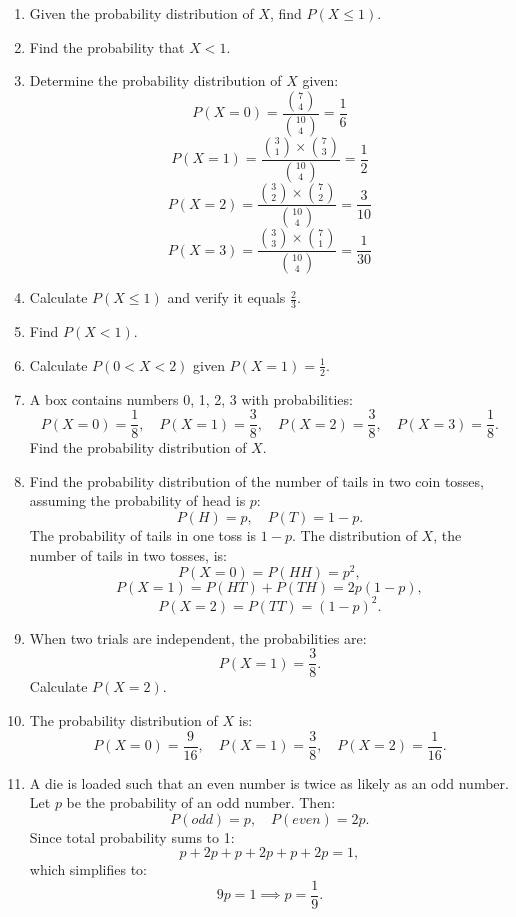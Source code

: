 \documentclass{article}
\begin{document}
\begin{enumerate}
    \item Given the probability distribution of \(X\), find \(P(X \leq 1)\).
    
    \item Find the probability that \(X < 1\).
    
    \item Determine the probability distribution of \(X\) given:
    \[
    P(X=0) = \frac{\binom{7}{4}}{\binom{10}{4}} = \frac{1}{6}
    \]
    \[
    P(X=1) = \frac{\binom{3}{1} \times \binom{7}{3}}{\binom{10}{4}} = \frac{1}{2}
    \]
    \[
    P(X=2) = \frac{\binom{3}{2} \times \binom{7}{2}}{\binom{10}{4}} = \frac{3}{10}
    \]
    \[
    P(X=3) = \frac{\binom{3}{3} \times \binom{7}{1}}{\binom{10}{4}} = \frac{1}{30}
    \]
    
    \item Calculate \(P(X \leq 1)\) and verify it equals \(\frac{2}{3}\).
    
    \item Find \(P(X<1)\).
    
    \item Calculate \(P(0 < X < 2)\) given \(P(X=1) = \frac{1}{2}\).
    
    \item A box contains numbers 0, 1, 2, 3 with probabilities:
    \[
    P(X=0) = \frac{1}{8}, \quad P(X=1) = \frac{3}{8}, \quad P(X=2) = \frac{3}{8}, \quad P(X=3) = \frac{1}{8}.
    \]
    Find the probability distribution of \(X\).
    
    \item Find the probability distribution of the number of tails in two coin tosses, assuming the probability of head is \(p\):
    \[
    P(H) = p, \quad P(T) = 1 - p.
    \]
    The probability of tails in one toss is \(1 - p\). The distribution of \(X\), the number of tails in two tosses, is:
    \[
    P(X=0) = P(HH) = p^2,
    \]
    \[
    P(X=1) = P(HT) + P(TH) = 2p(1-p),
    \]
    \[
    P(X=2) = P(TT) = (1-p)^2.
    \]
    
    \item When two trials are independent, the probabilities are:
    \[
    P(X=1) = \frac{3}{8}.
    \]
    Calculate \(P(X=2)\).
    
    \item The probability distribution of \(X\) is:
    \[
    P(X=0) = \frac{9}{16}, \quad P(X=1) = \frac{3}{8}, \quad P(X=2) = \frac{1}{16}.
    \]
    
    \item A die is loaded such that an even number is twice as likely as an odd number. Let \(p\) be the probability of an odd number. Then:
    \[
    P(odd) = p, \quad P(even) = 2p.
    \]
    Since total probability sums to 1:
    \[
    p + 2p + p + 2p + p + 2p = 1,
    \]
    which simplifies to:
    \[
    9p = 1 \implies p = \frac{1}{9}.
    \]
    

\end{enumerate}
\end{document}
